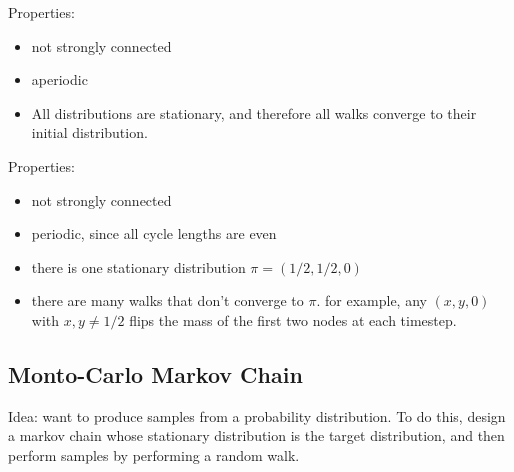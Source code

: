 \begin{example}
\exlabel

\begin{center}
\end{center}
\end{example}

Properties:
\begin{itemize}
    \item not strongly connected
    \item aperiodic
    \item All distributions are stationary, and therefore all walks converge to their initial distribution.
\end{itemize}

\begin{example}
\exlabel

\begin{center}
\end{center}
\end{example}

Properties:
\begin{itemize}
    \item not strongly connected
    \item periodic, since all cycle lengths are even
    \item there is one stationary distribution $\pi = (1/2, 1/2, 0)$
    \item there are many walks that don't converge to $\pi$. for example, any $(x,y,0)$ with $x,y\neq 1/2$ flips the mass of the first two nodes at each timestep.
\end{itemize}

\subsection{Monto-Carlo Markov Chain}

Idea: want to produce samples from a probability distribution. To do this, design a markov chain whose stationary distribution is the target distribution, and then perform samples by performing a random walk. 


